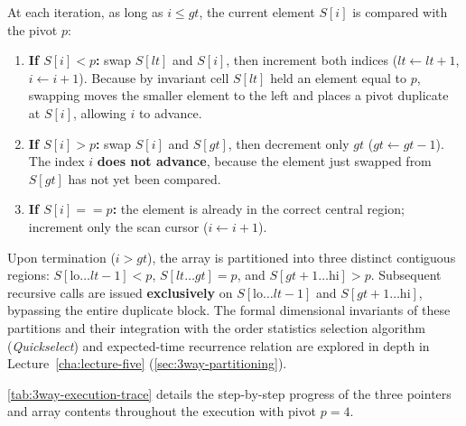 At each iteration, as long as $i \le gt$, the current element $S[i]$ is compared with the pivot $p$:
\begin{enumerate}
  \item \textbf{If $S[i] < p$:} swap $S[lt]$ and $S[i]$, then increment both indices ($lt \leftarrow lt + 1$, $i \leftarrow i + 1$). Because by invariant cell $S[lt]$ held an element equal to $p$, swapping moves the smaller element to the left and places a pivot duplicate at $S[i]$, allowing $i$ to advance.
  \item \textbf{If $S[i] > p$:} swap $S[i]$ and $S[gt]$, then decrement only $gt$ ($gt \leftarrow gt - 1$). The index $i$ \textbf{does not advance}, because the element just swapped from $S[gt]$ has not yet been compared.
  \item \textbf{If $S[i] == p$:} the element is already in the correct central region; increment only the scan cursor ($i \leftarrow i + 1$).
\end{enumerate}

Upon termination ($i > gt$), the array is partitioned into three distinct contiguous regions: $S[\text{lo} \dots lt-1] < p$, $S[lt \dots gt] = p$, and $S[gt+1 \dots \text{hi}] > p$. Subsequent recursive calls are issued \textbf{exclusively} on $S[\text{lo} \dots lt-1]$ and $S[gt+1 \dots \text{hi}]$, bypassing the entire duplicate block. The formal dimensional invariants of these partitions and their integration with the order statistics selection algorithm (\textit{Quickselect}) and expected-time recurrence relation are explored in depth in Lecture~\ref{cha:lecture-five} (\autoref{sec:3way-partitioning}).

\autoref{tab:3way-execution-trace} details the step-by-step progress of the three pointers and array contents throughout the execution with pivot $p = 4$.


